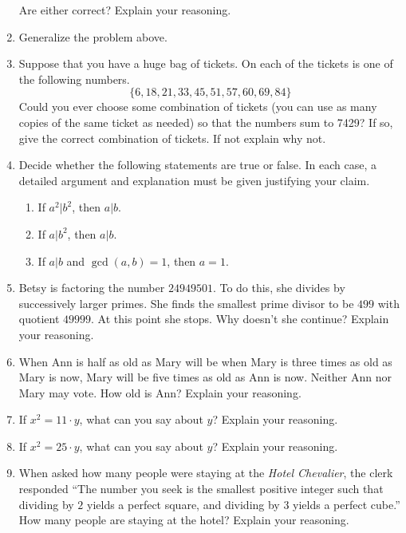 \begin{problems}
\begin{enumerate}
Are either correct?  Explain your reasoning.
\item Generalize the problem above.
\item Suppose that you have a huge bag of tickets. On each of the
  tickets is one of the following numbers. 
\[
\{6, 18, 21, 33, 45, 51, 57, 60, 69, 84\}
\]
Could you ever choose some combination of tickets (you can use as many
copies of the same ticket as needed) so that the numbers sum to 7429?
If so, give the correct combination of tickets. If not explain why
not.
\item\label{P:helper} Decide whether the following statements are true
  or false. In each case, a detailed argument and explanation must be
  given justifying your claim.
\begin{enumerate}
\item If $a^2|b^2$, then $a|b$.
\item If $a|b^2$, then $a|b$.
\item If $a|b$ and $\gcd(a,b) = 1$, then $a = 1$.
\end{enumerate}
\item Betsy is factoring the number $24949501$. To do this, she
  divides by successively larger primes. She finds the smallest prime
  divisor to be $499$ with quotient $49999$. At this point she
  stops. Why doesn't she continue? Explain your reasoning.
\item When Ann is half as old as Mary will be when Mary is three times
  as old as Mary is now, Mary will be five times as old as Ann is
  now. Neither Ann nor Mary may vote. How old is Ann? Explain your
  reasoning.
\item If $x^2 = 11\cdot y$, what can you say about $y$? Explain your
  reasoning.
\item If $x^2 = 25\cdot y$, what can you say about $y$? Explain your
  reasoning.
\item When asked how many people were staying at the \textit{Hotel
  Chevalier}, the clerk responded ``The number you seek is the
  smallest positive integer such that dividing by $2$ yields a perfect
  square, and dividing by $3$ yields a perfect cube.'' How many people
  are staying at the hotel? Explain your reasoning.
\end{enumerate}
\end{problems}

\newpage 
















